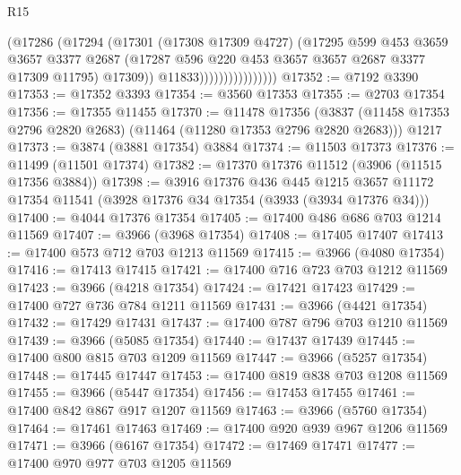 \begin{lexlean}{R15}
\begin{coremodule}
                                (@17286
                                  (@17294
                                    (@17301
                                      (@17308 @17309 @4727)
                                      (@17295
                                        @599
                                        @453
                                        @3659
                                        @3657
                                        @3377
                                        @2687
                                        (@17287
                                          @596
                                          @220
                                          @453
                                          @3657
                                          @3657
                                          @2687
                                          @3377
                                          @17309
                                          @11795)
                                        @17309))
                                    @11833))))))))))))))))
@17352 := @7192 @3390
@17353 := @17352 @3393
@17354 := @3560 @17353
@17355 := @2703 @17354
@17356 := @17355 @11455
@17370 := @11478
    @17356
    (@3837 (@11458 @17353 @2796 @2820 @2683) (@11464 (@11280 @17353 @2796 @2820 @2683)))
    @1217
@17373 := @3874 (@3881 @17354) @3884
@17374 := @11503 @17373
@17376 := @11499 (@11501 @17374)
@17382 := @17370 @17376 @11512 (@3906 (@11515 @17356 @3884))
@17398 := @3916
    @17376
    @436
    @445
    @1215
    @3657
    @11172
    @17354
    @11541
    (@3928 @17376 @34 @17354 (@3933 (@3934 @17376 @34)))
@17400 := @4044 @17376 @17354
@17405 := @17400 @486 @686 @703 @1214 @11569
@17407 := @3966 (@3968 @17354)
@17408 := @17405 @17407
@17413 := @17400 @573 @712 @703 @1213 @11569
@17415 := @3966 (@4080 @17354)
@17416 := @17413 @17415
@17421 := @17400 @716 @723 @703 @1212 @11569
@17423 := @3966 (@4218 @17354)
@17424 := @17421 @17423
@17429 := @17400 @727 @736 @784 @1211 @11569
@17431 := @3966 (@4421 @17354)
@17432 := @17429 @17431
@17437 := @17400 @787 @796 @703 @1210 @11569
@17439 := @3966 (@5085 @17354)
@17440 := @17437 @17439
@17445 := @17400 @800 @815 @703 @1209 @11569
@17447 := @3966 (@5257 @17354)
@17448 := @17445 @17447
@17453 := @17400 @819 @838 @703 @1208 @11569
@17455 := @3966 (@5447 @17354)
@17456 := @17453 @17455
@17461 := @17400 @842 @867 @917 @1207 @11569
@17463 := @3966 (@5760 @17354)
@17464 := @17461 @17463
@17469 := @17400 @920 @939 @967 @1206 @11569
@17471 := @3966 (@6167 @17354)
@17472 := @17469 @17471
@17477 := @17400 @970 @977 @703 @1205 @11569

\end{coremodule}
\end{lexlean}
